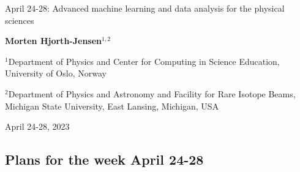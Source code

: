 \documentclass[%
oneside,                 %
final,                   %
10pt]{article}
\begin{document}

\newcommand{\exercisesection}[1]{\subsection*{#1}}






\thispagestyle{empty}

\begin{center}
{\LARGE\bf
\begin{spacing}{1.25}
April 24-28: Advanced machine learning and data analysis for the physical sciences
\end{spacing}
}
\end{center}


\begin{center}
{\bf Morten Hjorth-Jensen${}^{1, 2}$} \\ [0mm]
\end{center}

\begin{center}
\centerline{{\small ${}^1$Department of Physics and Center for Computing in Science Education, University of Oslo, Norway}}
\centerline{{\small ${}^2$Department of Physics and Astronomy and Facility for Rare Isotope Beams, Michigan State University, East Lansing, Michigan, USA}}
\end{center}
    

\begin{center}
April 24-28, 2023
\end{center}

\vspace{1cm}


\subsection{Plans for the week April 24-28}


\end{document}

